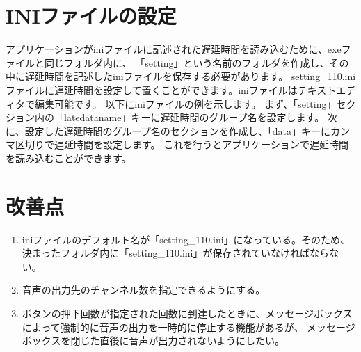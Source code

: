 \documentclass{article} %
\begin{document}
\section{INIファイルの設定}
アプリケーションがiniファイルに記述された遅延時間を読み込むために、exeファイルと同じフォルダ内に、
「setting」という名前のフォルダを作成し、その中に遅延時間を記述したiniファイルを保存する必要があります。
setting\_110.iniファイルに遅延時間を設定して置くことができます。iniファイルはテキストエディタで編集可能です。
以下にiniファイルの例を示します。
まず、「setting」セクション内の「latedataname」キーに遅延時間のグループ名を設定します。
次に、設定した遅延時間のグループ名のセクションを作成し、「data」キーにカンマ区切りで遅延時間を設定します。
これを行うとアプリケーションで遅延時間を読み込むことができます。

\section{改善点}
\begin{enumerate}
  \item iniファイルのデフォルト名が「setting\_110.ini」になっている。そのため、決まったフォルダ内に「setting\_110.ini」が保存されていなければならない。
  \item 音声の出力先のチャンネル数を指定できるようにする。
  \item ボタンの押下回数が指定された回数に到達したときに、メッセージボックスによって強制的に音声の出力を一時的に停止する機能があるが、
  メッセージボックスを閉じた直後に音声が出力されないようにしたい。
\end{enumerate}
\end{document}
